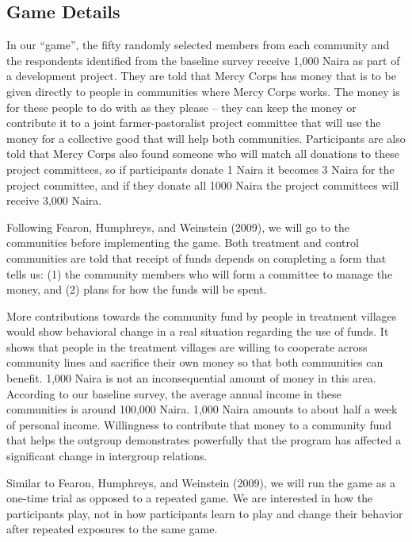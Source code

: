 \documentclass[
]{article}
\begin{document}
\hypertarget{game-details}{%
\subsection{Game Details}\label{game-details}}

In our ``game'', the fifty randomly selected members from each community
and the respondents identified from the baseline survey receive 1,000
Naira as part of a development project. They are told that Mercy Corps
has money that is to be given directly to people in communities where
Mercy Corps works. The money is for these people to do with as they
please -- they can keep the money or contribute it to a joint
farmer-pastoralist project committee that will use the money for a
collective good that will help both communities. Participants are also
told that Mercy Corps also found someone who will match all donations to
these project committees, so if participants donate 1 Naira it becomes 3
Naira for the project committee, and if they donate all 1000 Naira the
project committees will receive 3,000 Naira.

Following Fearon, Humphreys, and Weinstein (2009), we will go to the
communities before implementing the game. Both treatment and control
communities are told that receipt of funds depends on completing a form
that tells us: (1) the community members who will form a committee to
manage the money, and (2) plans for how the funds will be spent.

More contributions towards the community fund by people in treatment
villages would show behavioral change in a real situation regarding the
use of funds. It shows that people in the treatment villages are willing
to cooperate across community lines and sacrifice their own money so
that both communities can benefit. 1,000 Naira is not an inconsequential
amount of money in this area. According to our baseline survey, the
average annual income in these communities is around 100,000 Naira.
1,000 Naira amounts to about half a week of personal income. Willingness
to contribute that money to a community fund that helps the outgroup
demonstrates powerfully that the program has affected a significant
change in intergroup relations.

Similar to Fearon, Humphreys, and Weinstein (2009), we will run the game
as a one-time trial as opposed to a repeated game. We are interested in
how the participants play, not in how participants learn to play and
change their behavior after repeated exposures to the same game.
\end{document}

